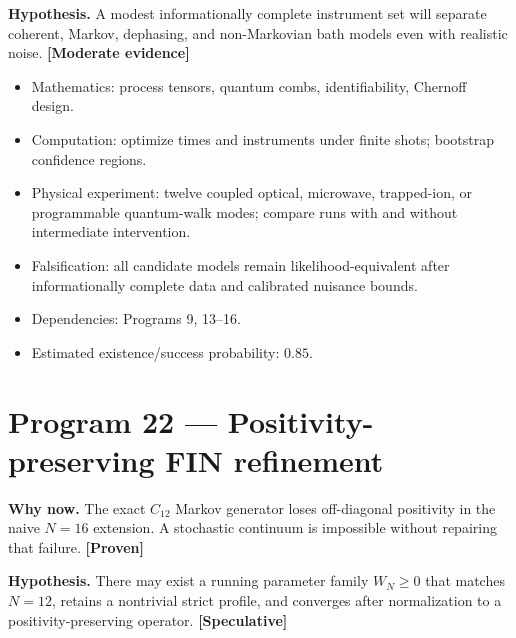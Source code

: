 \documentclass[11pt,a4paper,openany]{report}
\newcommand{\statusProven}{\textcolor{fingreen}{[Proven]}}
\newcommand{\statusModerate}{\textcolor{finviolet}{[Moderate evidence]}}
\newcommand{\statusSpeculative}{\textcolor{finorange}{[Speculative]}}
\begin{document}
\textbf{Hypothesis.} A modest informationally complete instrument set will separate coherent, Markov, dephasing, and non-Markovian bath models even with realistic noise. \textbf{\statusModerate{}}

\begin{itemize}
\item 
Mathematics: process tensors, quantum combs, identifiability, Chernoff design.

\item 
Computation: optimize times and instruments under finite shots; bootstrap confidence regions.

\item 
Physical experiment: twelve coupled optical, microwave, trapped-ion, or programmable quantum-walk modes; compare runs with and without intermediate intervention.

\item 
Falsification: all candidate models remain likelihood-equivalent after informationally complete data and calibrated nuisance bounds.

\item 
Dependencies: Programs 9, 13–16.

\item 
Estimated existence/\allowbreak{}success probability: \(0.85\).

\end{itemize}

\section{Program 22 — Positivity-preserving FIN refinement}

\textbf{Why now.} The exact \(C_{12}\) Markov generator loses off-diagonal positivity in the naive \(N=16\) extension. A stochastic continuum is impossible without repairing that failure. \textbf{\statusProven{}}

\textbf{Hypothesis.} There may exist a running parameter family \(W_N\ge0\) that matches \(N=12\), retains a nontrivial strict profile, and converges after normalization to a positivity-preserving operator. \textbf{\statusSpeculative{}}
\end{document}
